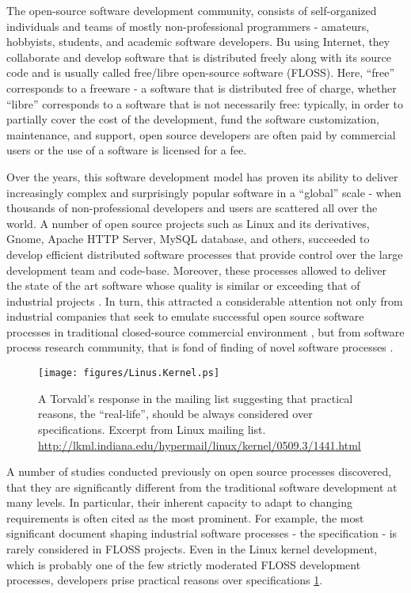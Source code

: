 The open-source software development community, consists of self-organized individuals and teams of 
mostly non-professional programmers - amateurs, hobbyists, students, and academic software developers. 
Bu using Internet, they collaborate and develop software that is distributed freely along with its 
source code and is usually called free/libre open-source software (FLOSS). 
Here, ``free'' corresponds to a freeware - a software that is distributed free of charge, whether 
``libre'' corresponds to a software that is not necessarily free: typically, in order to partially 
cover the cost of the development, fund the software customization, maintenance, and support, 
open source developers are often paid by commercial users or the use of a software is licensed for a fee.

Over the years, this software development model has proven its ability to deliver increasingly complex 
and surprisingly popular software in a ``global'' scale - when thousands of non-professional developers 
and users are scattered all over the world. A number of open source projects such as Linux and its 
derivatives, Gnome, Apache HTTP Server, MySQL database, and others, succeeded to develop efficient 
distributed software processes that provide control over the large development team and code-base.
Moreover, these processes allowed to deliver the state of the art software whose quality is similar 
or exceeding that of industrial projects \cite{coverity2012}. 
In turn, this attracted a considerable attention not only from industrial companies that seek to emulate 
successful open source software processes in traditional closed-source commercial environment 
\cite{oss_virtual_organizations} \cite{oss_balance} \cite{oss_hp} \cite{oss_4industry}, 
but from software process research community, that is fond of finding of novel software processes
\cite{citeulike:12550640} \cite{citeulike:5043664} \cite{citeulike:5128808} \cite{citeulike:10377366}.

\begin{figure}[ht!]
   \centering
   \texttt{[image: figures/Linus.Kernel.ps]}
   \caption{A Torvald's response in the mailing list suggesting that practical reasons, the ``real-life'', 
   should be always considered over specifications.
   Excerpt from Linux mailing list. \url{http://lkml.indiana.edu/hypermail/linux/kernel/0509.3/1441.html}}
   \label{fig:kernel}
\end{figure}

A number of studies conducted previously on open source processes discovered, that they are significantly 
different from the traditional software development at many levels. In particular, their inherent capacity 
to adapt to changing requirements is often cited as the most prominent. 
For example, the most significant document shaping industrial software processes - the specification - is rarely 
considered in FLOSS projects. Even in the Linux kernel development, which is probably one of the few strictly 
moderated FLOSS development processes, developers prise practical reasons over specifications \ref{fig:kernel}.

